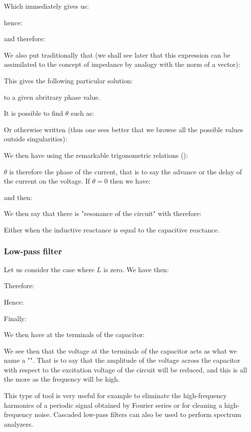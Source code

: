 	Which immediately gives us:
	
	hence:
	
	and therefore:
	
	We also put traditionally that (we shall see later that this expression can be assimilated to the concept of impedance by analogy with the norm of a vector):
	
	This gives the following particular solution:
	
	to a given abritrary phase value.
	
	It is possible to find $\theta$ such as:
	
	Or otherwise written (thus one sees better that we browse all the possible values outside singularities):
	
	We then have using the remarkable trigonometric relations ():
	
	$\theta$ is therefore the phase of the current, that is to say the advance or the delay of the current on the voltage. If $\theta=0$ then we have:
	
	and then:
	
	We then say that there is "resonance of the circuit" with therefore:
	
	Either when the inductive reactance is equal to the capacitive reactance.
	
	\subsubsection{Low-pass filter}
	Let us consider the case where $L$ is zero. We have then:
	
	Therefore:
	
	Hence:
	
	Finally:
	
	We then have at the terminals of the capacitor:
	
	We see then that the voltage at the terminals of the capacitor acts as what we name a "". That is to say that the amplitude of the voltage across the capacitor with respect to the excitation voltage of the circuit will be reduced, and this is all the more as the frequency will be high.

	This type of tool is very useful for example to eliminate the high-frequency harmonics of a periodic signal obtained by Fourier series or for cleaning a high-frequency noise. Cascaded low-pass filters can also be used to perform spectrum analyzers.

